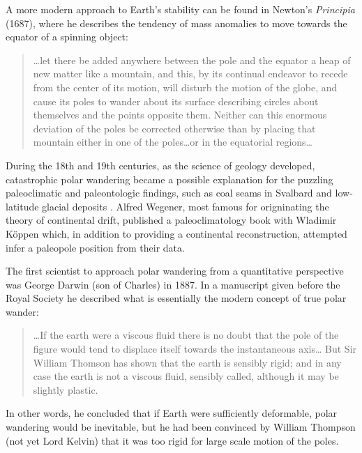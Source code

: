 A more modern approach to Earth's stability can be found in Newton's \emph{Principia} (1687),
where he describes the tendency of mass anomalies to move towards the equator of a spinning object:
\begin{quote}
\ldots let there be added anywhere between the pole and the equator a heap of new matter like a mountain,
and this, by its continual endeavor to recede from the center of its motion, will disturb the motion of the globe, 
and cause its poles to wander about its surface describing circles about themselves and the points opposite them.
Neither can this enormous deviation of the poles be corrected otherwise than by placing that mountain either in
one of the poles\ldots or in the equatorial regions\ldots
\end{quote}

During the 18th and 19th centuries, as the science of geology developed, catastrophic polar wandering
became a possible explanation for the puzzling paleoclimatic and paleontologic findings, such as coal
seams in Svalbard and low-latitude glacial deposits \citep{barrell1914status}.
Alfred Wegener, most famous for origninating the theory of continental drift,
published a paleoclimatology book with Wladimir K\"oppen \citep{koppen1924} which,
in addition to providing a continental reconstruction, attempted infer a paleopole
position from their data.

The first scientist to approach polar wandering from a quantitative perspective was
George Darwin (son of Charles) in 1887. In a manuscript given before the Royal Society \citep{darwin1887influence}
he described what is essentially the modern concept of true polar wander:
\begin{quote}
\ldots If the earth were a viscous fluid there is no doubt that the pole of the figure would
tend to displace itself towards the instantaneous axis\ldots 
But Sir William Thomson has shown that the earth is sensibly rigid; 
and in any case the earth is not a viscous fluid, sensibly called, although it may be slightly plastic.
\end{quote}
In other words, he concluded that if Earth were sufficiently deformable, 
polar wandering would be inevitable, but he had been convinced by William Thompson (not yet Lord Kelvin)
that it was too rigid for large scale motion of the poles.

